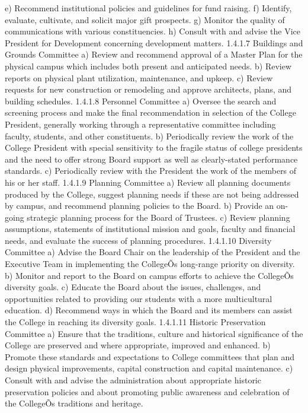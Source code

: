 \documentclass[letterpaper, 11pt]{article}
\begin{document}
e) Recommend institutional policies and guidelines for fund raising.
f) Identify, evaluate, cultivate, and solicit major gift prospects.
g) Monitor the quality of communications with various constituencies.
h) Consult with and advise the Vice President for Development concerning development matters.
1.4.1.7 Buildings and Grounds Committee
a) Review and recommend approval of a Master Plan for the physical campus which includes both present and anticipated needs.
b) Review reports on physical plant utilization, maintenance, and upkeep.
c) Review requests for new construction or remodeling and approve architects, plans, and building schedules.
1.4.1.8 Personnel Committee
a) Oversee the search and screening process and make the final recommendation in selection of the College President, generally working through a representative committee including faculty, students, and other constituents.
b) Periodically review the work of the College President with special sensitivity to the fragile status of college presidents and the need to offer strong Board support as well as clearly-stated performance standards.
c) Periodically review with the President the work of the members of his or her staff.
1.4.1.9 Planning Committee
a) Review all planning documents produced by the College, suggest planning needs if these are not being addressed by campus, and recommend planning policies to the Board.
b) Provide an on-going strategic planning process for the Board of Trustees.
c) Review planning assumptions, statements of institutional mission and goals, faculty and financial needs, and evaluate the success of planning procedures.
1.4.1.10 Diversity Committee
a) Advise the Board Chair on the leadership of the President and the Executive Team in implementing the CollegeÕs long-range priority on diversity.
b) Monitor and report to the Board on campus efforts to achieve the CollegeÕs diversity goals.
c) Educate the Board about the issues, challenges, and opportunities related to providing our students with a more multicultural education.
d) Recommend ways in which the Board and its members can assist the College in reaching its diversity goals.
1.4.1.11 Historic Preservation Committee
a) Ensure that the traditions, culture and historical significance of the College are preserved and where appropriate, improved and enhanced.
b) Promote these standards and expectations to College committees that plan and design physical improvements, capital construction and capital maintenance.
c) Consult with and advise the administration about appropriate historic preservation policies and about promoting public awareness and celebration of the CollegeÕs traditions and heritage.
\end{document}
